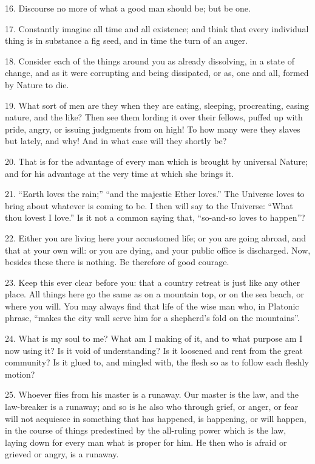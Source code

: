 \documentclass{book}
\begin{document}
16. Discourse no more of what a good man should be; but be one.

17. Constantly imagine all time and all existence; and think that
every individual thing is in substance a fig seed, and in time the
turn of an auger.

18. Consider each of the things around you as already dissolving, in a
state of change, and as it were corrupting and being dissipated, or
as, one and all, formed by Nature to die.

19. What sort of men are they when they are eating, sleeping,
procreating, easing nature, and the like? Then see them lording it
over their fellows, puffed up with pride, angry, or issuing judgments
from on high! To how many were they slaves but lately, and why! And in
what case will they shortly be?

20. That is for the advantage of every man which is brought by
universal Nature; and for his advantage at the very time at which she
brings it.

21. ``Earth loves the rain;'' ``and the majestic Ether loves.'' The
Universe loves to bring about whatever is coming to be. I then will
say to the Universe: ``What thou lovest I love.'' Is it not a common
saying that, ``so-and-so loves to happen''?

22. Either you are living here your accustomed life; or you are going
abroad, and that at your own will: or you are dying, and your public
office is discharged. Now, besides these there is nothing. Be
therefore of good courage.

23. Keep this ever clear before you: that a country retreat is just
like any other place. All things here go the same as on a mountain
top, or on the sea beach, or where you will. You may always find that
life of the wise man who, in Platonic phrase, ``makes the city wall
serve him for a shepherd's fold on the mountains''.

24. What is my soul to me? What am I making of it, and to what purpose
am I now using it? Is it void of understanding? Is it loosened and
rent from the great community? Is it glued to, and mingled with, the
flesh so as to follow each fleshly motion?

25. Whoever flies from his master is a runaway. Our master is the law,
and the law-breaker is a runaway; and so is he also who through grief,
or anger, or fear will not acquiesce in something that has happened,
is happening, or will happen, in the course of things predestined by
the all-ruling power which is the law, laying down for every man what
is proper for him. He then who is afraid or grieved or angry, is a
runaway.
\end{document}
